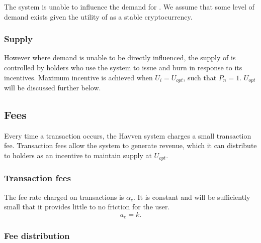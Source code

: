 \noindent The system is unable to influence the demand for \NOM{}. We assume that some level of demand exists given the utility of \NOM{} as a stable cryptocurrency.

\subsubsection*{Supply}

\noindent However where demand is unable to be directly influenced, the supply of \NOM{} is controlled by \HAV{} holders who use the system to issue and burn \NOM{} in response to its incentives. Maximum incentive is achieved when $U_i = U_{opt}$, such that $P_n = 1$. $U_{opt}$ will be discussed further below. \\

\newpage
\subsection{Fees} Every time a \NOM{} transaction occurs, the Havven system charges a small transaction fee. Transaction fees allow the system to generate revenue, which it can distribute to \HAV{} holders as an incentive to maintain \NOM{} supply at $U_{opt}$.

\subsubsection{Transaction fees}

\noindent The fee rate charged on \NOM{} transactions is $\alpha_c$. It is constant and will be sufficiently small that it provides little to no friction for the user.\\

$$ a_c = k.$$ 


\newpage
\subsubsection{Fee distribution}

